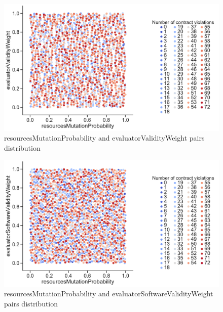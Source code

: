 \begin{figure}
	\centering
	\includegraphics[width=\textwidth]{images/PairsDistr/resourcesMutationProbability_evaluatorValidityWeight.pdf}
	\caption[resourcesMutationProbability and evaluatorValidityWeight pairs distribution]{resourcesMutationProbability and evaluatorValidityWeight pairs distribution}
	\label{fig:resourcesMutationProbability_evaluatorValidityWeight_pair}
\end{figure}
\begin{figure}
	\centering
	\includegraphics[width=\textwidth]{images/PairsDistr/resourcesMutationProbability_evaluatorSoftwareValidityWeight.pdf}
	\caption[resourcesMutationProbability and evaluatorSoftwareValidityWeight pairs distribution]{resourcesMutationProbability and evaluatorSoftwareValidityWeight pairs distribution}
	\label{fig:resourcesMutationProbability_evaluatorSoftwareValidityWeight_pair}
\end{figure}
